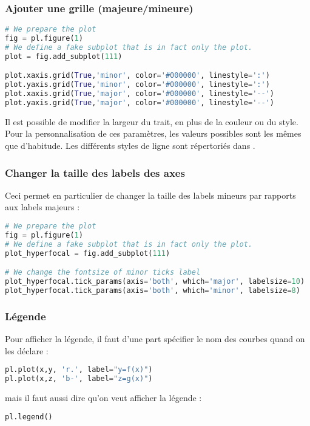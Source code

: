 \documentclass[a4paper,twoside]{article}
\begin{document}
\subsubsection{Ajouter une grille (majeure/mineure)}
\begin{lstlisting}[language=python]
# We prepare the plot
fig = pl.figure(1)
# We define a fake subplot that is in fact only the plot.
plot = fig.add_subplot(111)

plot.xaxis.grid(True,'minor', color='#000000', linestyle=':')
plot.yaxis.grid(True,'minor', color='#000000', linestyle=':')
plot.xaxis.grid(True,'major', color='#000000', linestyle='--')
plot.yaxis.grid(True,'major', color='#000000', linestyle='--')
\end{lstlisting}

Il est possible de modifier la largeur du trait, en plus de la couleur ou du style. Pour la personnalisation de ces paramètres, les valeurs possibles sont les mêmes que d'habitude. Les différents styles de ligne sont répertoriés dans .

\subsubsection{Changer la taille des labels des axes}
Ceci permet en particulier de changer la taille des labels mineurs par rapports aux labels majeurs :
\begin{lstlisting}[language=python]
# We prepare the plot
fig = pl.figure(1)
# We define a fake subplot that is in fact only the plot.
plot_hyperfocal = fig.add_subplot(111)

# We change the fontsize of minor ticks label
plot_hyperfocal.tick_params(axis='both', which='major', labelsize=10)
plot_hyperfocal.tick_params(axis='both', which='minor', labelsize=8)
\end{lstlisting}

\subsubsection{Légende}
Pour afficher la légende, il faut d'une part spécifier le nom des courbes quand on les déclare : 
\begin{lstlisting}[language=python]
pl.plot(x,y, 'r.', label="y=f(x)")
pl.plot(x,z, 'b-', label="z=g(x)")
\end{lstlisting}
mais il faut aussi dire qu'on veut afficher la légende :
\begin{lstlisting}[language=python]
pl.legend()
\end{lstlisting}
\end{document}
